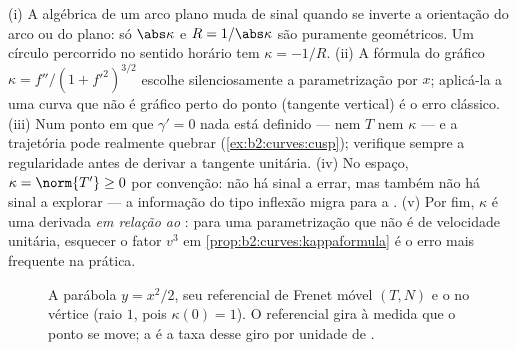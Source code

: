 \begin{remark}
(i) A  algébrica de um arco plano muda de sinal quando
se inverte a orientação do arco ou do plano: só
$\abs\kappa$ e $R = 1/\abs\kappa$ são puramente geométricos. Um
círculo percorrido no sentido horário tem $\kappa = -1/R$. (ii) A
fórmula do gráfico $\kappa = f''/(1 + f'^2)^{3/2}$ escolhe
silenciosamente a parametrização por $x$; aplicá-la a uma curva
que não é gráfico perto do ponto (tangente vertical) é o
erro clássico. (iii) Num ponto em que $\gamma' = 0$
nada está definido --- nem $T$ nem $\kappa$ --- e a
trajetória pode realmente quebrar
(\cref{ex:b2:curves:cusp}); verifique sempre a regularidade antes de
derivar a tangente unitária. (iv) No espaço, $\kappa =
\norm{T'} \geq 0$ por convenção: não há sinal a errar,
mas também não há sinal a explorar --- a informação do tipo
inflexão migra para a . (v) Por fim, $\kappa$ é
uma derivada \emph{em relação ao }: para uma
parametrização que não é de velocidade unitária, esquecer o fator $v^3$
em \cref{prop:b2:curves:kappaformula} é o erro mais frequente
na prática.
\end{remark}

\begin{figure}[ht]
\centering
{}
\caption{A parábola $y = x^2/2$, seu referencial de Frenet móvel $(T,
N)$ e o  no vértice (raio $1$, pois
$\kappa(0) = 1$). O referencial gira à medida que o ponto se move; a  é
a taxa desse giro por unidade de .}
\label{fig:b2:curves:osculating}
\end{figure}

